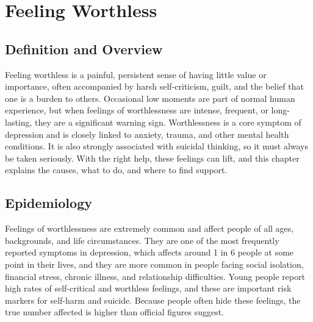 \chapter{Feeling Worthless}

\section*{Definition and Overview}
Feeling worthless is a painful, persistent sense of having little value or importance, often accompanied by harsh self-criticism, guilt, and the belief that one is a burden to others. Occasional low moments are part of normal human experience, but when feelings of worthlessness are intense, frequent, or long-lasting, they are a significant warning sign. Worthlessness is a core symptom of depression and is closely linked to anxiety, trauma, and other mental health conditions. It is also strongly associated with suicidal thinking, so it must always be taken seriously. With the right help, these feelings can lift, and this chapter explains the causes, what to do, and where to find support.

\section*{Epidemiology}
Feelings of worthlessness are extremely common and affect people of all ages, backgrounds, and life circumstances. They are one of the most frequently reported symptoms in depression, which affects around 1 in 6 people at some point in their lives, and they are more common in people facing social isolation, financial stress, chronic illness, and relationship difficulties. Young people report high rates of self-critical and worthless feelings, and these are important risk markers for self-harm and suicide. Because people often hide these feelings, the true number affected is higher than official figures suggest.

